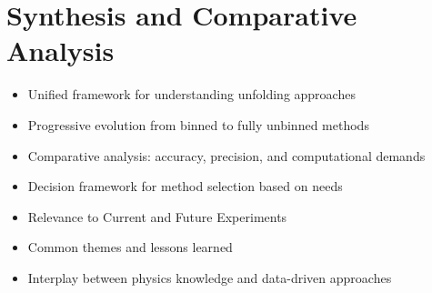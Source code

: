 \chapter{Synthesis and Comparative Analysis}
\begin{itemize}
    \item Unified framework for understanding unfolding approaches
    \item Progressive evolution from binned to fully unbinned methods
    \item Comparative analysis: accuracy, precision, and computational demands
    \item Decision framework for method selection based on needs
    \item Relevance to Current and Future Experiments
    \item Common themes and lessons learned
    \item Interplay between physics knowledge and data-driven approaches
\end{itemize}